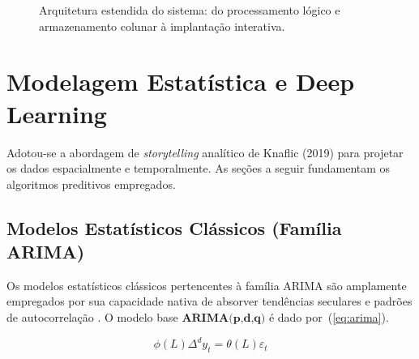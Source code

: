 \documentclass[10pt,conference]{IEEEtran}
\begin{document}
\begin{figure}[!ht]
{%
}
\caption{Arquitetura estendida do sistema: do processamento lógico e armazenamento colunar à implantação interativa.}
\label{fig:arquitetura}
\end{figure}



\section{Modelagem Estatística e Deep Learning}

Adotou-se a abordagem de \textit{storytelling} analítico de Knaflic (2019) para projetar os dados espacialmente e temporalmente. As seções a seguir fundamentam os algoritmos preditivos empregados. 

\subsection{Modelos Estatísticos Clássicos (Família ARIMA)}
Os modelos estatísticos clássicos pertencentes à família ARIMA são amplamente empregados por sua capacidade nativa de absorver tendências seculares e padrões de autocorrelação \cite{box1970time}. O modelo base $\textbf{ARIMA(p,d,q)}$ é dado por~(\ref{eq:arima}).

\begin{equation}
\phi(L)\Delta^{d} y_{t} = \theta(L)\varepsilon_{t}
\label{eq:arima}
\end{equation}
\end{document}
